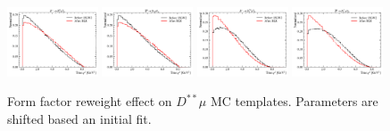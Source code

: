 \begin{figure}[ht]
    \includegraphics[width=0.24\textwidth]{
        ./figs-mc-correction/reweighting-form-factors/DststMu/D1stst0Mu.pdf
    }
    \includegraphics[width=0.24\textwidth]{
        ./figs-mc-correction/reweighting-form-factors/DststMu/D1ststMu.pdf
    }
    \includegraphics[width=0.24\textwidth]{
        ./figs-mc-correction/reweighting-form-factors/DststMu/D2stst0Mu.pdf
    }
    \includegraphics[width=0.24\textwidth]{
        ./figs-mc-correction/reweighting-form-factors/DststMu/D2ststMu.pdf
    }

    \caption{
        Form factor reweight effect on $D^{**}\mu$ MC templates.
        Parameters are shifted based an initial fit.
    }
    \label{fig:ff-rwt-Dstst-norm-like}
\end{figure}


